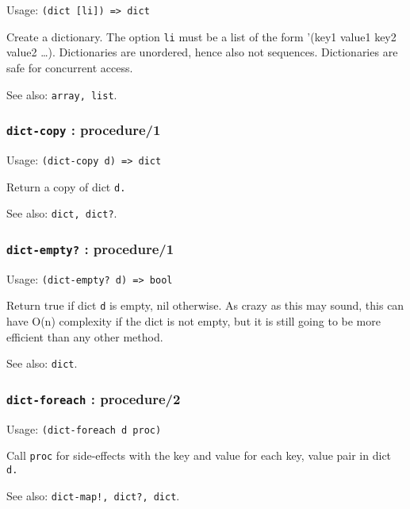 \documentclass[
]{article}
\newcommand{\passthrough}[1]{#1}
\begin{document}
Usage: \passthrough{\lstinline!(dict [li]) => dict!}

Create a dictionary. The option \passthrough{\lstinline!li!} must be a
list of the form '(key1 value1 key2 value2 \ldots). Dictionaries are
unordered, hence also not sequences. Dictionaries are safe for
concurrent access.

See also: \passthrough{\lstinline!array, list!}.

\hypertarget{dict-copy-procedure1}{%
\subsubsection{\texorpdfstring{\texttt{dict-copy} :
procedure/1}{dict-copy : procedure/1}}\label{dict-copy-procedure1}}

Usage: \passthrough{\lstinline!(dict-copy d) => dict!}

Return a copy of dict \passthrough{\lstinline!d.!}

See also: \passthrough{\lstinline!dict, dict?!}.

\hypertarget{dict-empty-procedure1}{%
\subsubsection{\texorpdfstring{\texttt{dict-empty?} :
procedure/1}{dict-empty? : procedure/1}}\label{dict-empty-procedure1}}

Usage: \passthrough{\lstinline!(dict-empty? d) => bool!}

Return true if dict \passthrough{\lstinline!d!} is empty, nil otherwise.
As crazy as this may sound, this can have O(n) complexity if the dict is
not empty, but it is still going to be more efficient than any other
method.

See also: \passthrough{\lstinline!dict!}.

\hypertarget{dict-foreach-procedure2}{%
\subsubsection{\texorpdfstring{\texttt{dict-foreach} :
procedure/2}{dict-foreach : procedure/2}}\label{dict-foreach-procedure2}}

Usage: \passthrough{\lstinline!(dict-foreach d proc)!}

Call \passthrough{\lstinline!proc!} for side-effects with the key and
value for each key, value pair in dict \passthrough{\lstinline!d.!}

See also: \passthrough{\lstinline"dict-map!, dict?, dict"}.
\end{document}

